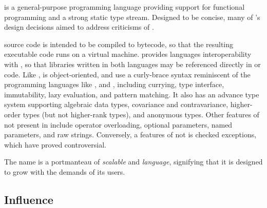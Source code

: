 \documentclass[../Languages.tex]{subfiles}
\begin{document}
\label{sec:scala}

 is a general-purpose programming language providing support for
functional programming and a strong static type stream. Designed to be concise,
many of 's design decisions aimed to address criticisms of .

 source code is intended to be compiled to  bytecode, so
that the resulting executable code runs on a  virtual machine.
 provides languages interoperability with , so that
libraries written in both languages may be referenced directly in  or
 code. Like ,  is object-oriented, and use a
curly-brace syntax reminiscent of the  programming languages like
,  and , including currying, type
interface, immutability, lazy evaluation, and pattern matching. It also has an
advance type system supporting algebraic data types, covariance and
contravariance, higher-order types (but not higher-rank types), and anonymous
types. Other features of  not present in  include operator
overloading, optional parameters, named parameters, and raw strings.
Conversely, a features of  not  is checked exceptions, which
have proved controversial.

The name  is a portmanteau of \textit{scalable} and
\textit{language}, signifying that it is designed to grow with the demands of
its users. 

\subsection{Influence}\label{sub:influence}
\end{document}
